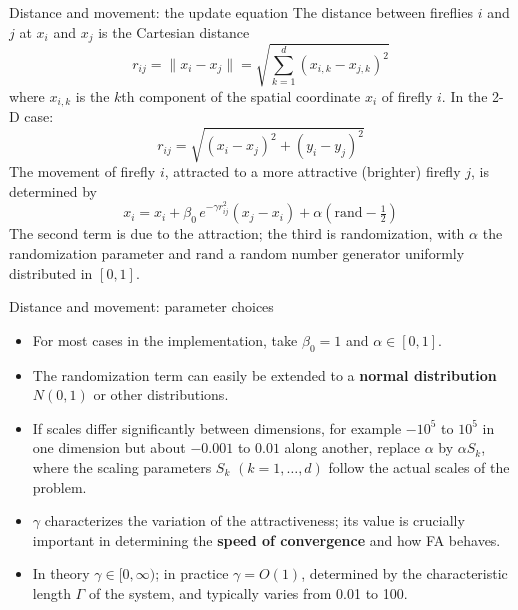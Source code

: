 \documentclass[aspectratio=169,11pt]{beamer}
\newcommand{\hdr}[1]{\gdef\curhdr{#1}}
\gdef\curhdr{}
\begin{document}
\hdr{3 Firefly Algorithm \textperiodcentered{} 3.4 Distance and Movement}
\begin{frame}[t]{Distance and movement: the update equation}
\small
The distance between fireflies $i$ and $j$ at $x_i$ and $x_j$ is the Cartesian distance
\begin{equation*}r_{ij}=\lVert x_i-x_j\rVert=\sqrt{\sum_{k=1}^{d}(x_{i,k}-x_{j,k})^{2}}\tag{8}\end{equation*}
where $x_{i,k}$ is the $k$th component of the spatial coordinate $x_i$ of firefly $i$. In the 2-D case:
\[r_{ij}=\sqrt{(x_i-x_j)^2+(y_i-y_j)^2}\]
The movement of firefly $i$, attracted to a more attractive (brighter) firefly $j$, is determined by
\begin{equation*}x_i=x_i+\beta_0\,e^{-\gamma r_{ij}^{2}}(x_j-x_i)+\alpha\left(\mathrm{rand}-\tfrac12\right)\tag{9}\end{equation*}
The second term is due to the attraction; the third is randomization, with $\alpha$ the randomization parameter and $\mathrm{rand}$ a random number generator uniformly distributed in $[0,1]$.
\end{frame}

\begin{frame}[t]{Distance and movement: parameter choices}
\small
\begin{itemize}\itemsep0.6em
  \item For most cases in the implementation, take $\beta_0=1$ and $\alpha\in[0,1]$.
  \item The randomization term can easily be extended to a \textbf{normal distribution} $N(0,1)$ or other distributions.
  \item If scales differ significantly between dimensions, for example $-10^5$ to $10^5$ in one dimension but about $-0.001$ to $0.01$ along another, replace $\alpha$ by $\alpha S_k$, where the scaling parameters $S_k$ $(k=1,\dots,d)$ follow the actual scales of the problem.
  \item $\gamma$ characterizes the variation of the attractiveness; its value is crucially important in determining the \textbf{speed of convergence} and how FA behaves.
  \item In theory $\gamma\in[0,\infty)$; in practice $\gamma=O(1)$, determined by the characteristic length $\Gamma$ of the system, and typically varies from 0.01 to 100.
\end{itemize}
\end{frame}
\end{document}
